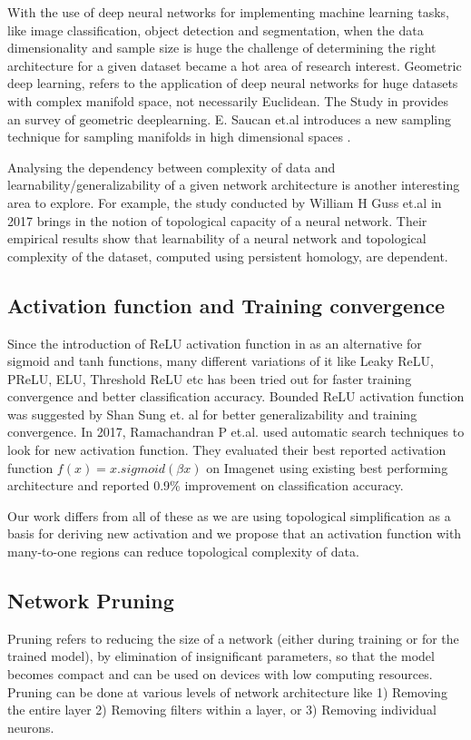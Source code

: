 \documentclass{bmvc2k}
\begin{document}
With the use of deep neural networks for implementing machine learning tasks, like image classification, object detection and segmentation, when the data dimensionality and sample size is huge the challenge of determining the right architecture for a given dataset became a hot area of research interest.
Geometric deep learning, refers to the application of deep neural networks for huge datasets with complex manifold space, not necessarily Euclidean.
The Study in  \cite{bronstein2017geometric} provides an  survey of geometric deeplearning.
 E. Saucan et.al introduces a new sampling technique for sampling manifolds in high dimensional spaces \cite{saucan2007geometric}.

Analysing the dependency between complexity of data and learnability/generalizability of a given network architecture is another interesting area to explore.
For example, the study conducted by William H Guss et.al \cite{chazal2017introduction}  in 2017 brings in the notion of topological capacity of a neural network.
Their empirical results show that learnability of a neural network and  topological complexity of the dataset, computed using persistent homology, are dependent.

\subsection{Activation function and Training convergence}
Since the introduction of ReLU activation function in \cite{krizhevsky2012imagenet} as an alternative for sigmoid and tanh functions, many different variations of it like Leaky ReLU, PReLU, ELU, Threshold ReLU etc has been tried out for faster training convergence and better classification accuracy.
Bounded ReLU activation function was suggested by Shan Sung et. al \cite{liew2016bounded} for better generalizability and training convergence.
In 2017, Ramachandran P et.al. \cite{ramachandran2017searching} used automatic search techniques to look for new activation function.
They evaluated their  best reported activation function $f(x)=x.sigmoid(\beta x)$ on Imagenet using existing best performing architecture and reported 0.9\% improvement on classification accuracy.

Our work differs from all of these as we are using topological simplification as a basis for deriving new activation and we propose that an activation function with many-to-one regions can reduce topological complexity of data.

\subsection{Network Pruning}
Pruning refers to reducing the size of a network (either during training or  for the trained model), by elimination of insignificant parameters,  so that the model becomes compact and can be used on devices with low computing resources.
Pruning can be done at various levels of network architecture like 1) Removing the entire layer 2) Removing filters within a layer,  or 3) Removing individual neurons.
\end{document}

